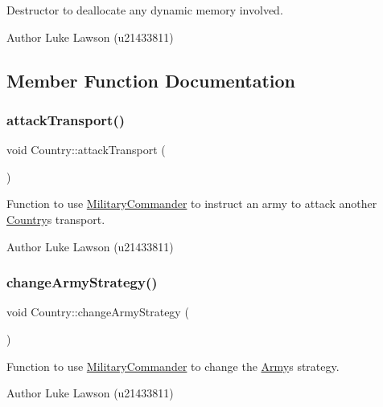 Destructor to deallocate any dynamic memory involved. 

\begin{DoxyAuthor}{Author}
Luke Lawson (u21433811) 
\end{DoxyAuthor}


\subsection{Member Function Documentation}
\mbox{\label{class_country_a1097aaf13d5a15eb30ea0ccc4b7fa211}} 
\subsubsection{\texorpdfstring{attackTransport()}{attackTransport()}}
{\footnotesize\ttfamily void Country\+::attack\+Transport (\begin{DoxyParamCaption}{ }\end{DoxyParamCaption})}



Function to use \mbox{\hyperlink{class_military_commander}{Military\+Commander}} to instruct an army to attack another \mbox{\hyperlink{class_country}{Country}}\textquotesingle{}s transport. 

\begin{DoxyAuthor}{Author}
Luke Lawson (u21433811) 
\end{DoxyAuthor}
\mbox{\label{class_country_adfb891f4f46c41276395d09cc9bc2a6a}} 
\subsubsection{\texorpdfstring{changeArmyStrategy()}{changeArmyStrategy()}}
{\footnotesize\ttfamily void Country\+::change\+Army\+Strategy (\begin{DoxyParamCaption}{ }\end{DoxyParamCaption})}



Function to use \mbox{\hyperlink{class_military_commander}{Military\+Commander}} to change the \mbox{\hyperlink{class_army}{Army}}\textquotesingle{}s strategy. 

\begin{DoxyAuthor}{Author}
Luke Lawson (u21433811) 
\end{DoxyAuthor}
\mbox{\label{class_country_af8b0fd589846db503b902d6f6ed19003}} 
